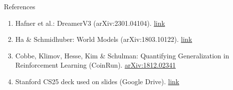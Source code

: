 \begin{frame}[allowframebreaks]{References}
\begin{enumerate}
    \item Hafner et al.: {DreamerV3} ({arXiv}:2301.04104). \href{https://arxiv.org/abs/2301.04104}{link}
    \item Ha \& Schmidhuber: World Models ({arXiv}:1803.10122). \href{https://arxiv.org/abs/1803.10122}{link}
    \item Cobbe, Klimov, Hesse, Kim \& Schulman: Quantifying Generalization in Reinforcement Learning ({CoinRun}). \href{https://arxiv.org/abs/1812.02341}{arXiv:1812.02341}
    \item Stanford {CS25} deck used on slides ({Google} Drive). \href{https://drive.google.com/file/d/1bF5Yfzf-FG5iNIAgsXn2DwVD3l3ymvZW/view}{link}
  \end{enumerate}
\end{frame}
